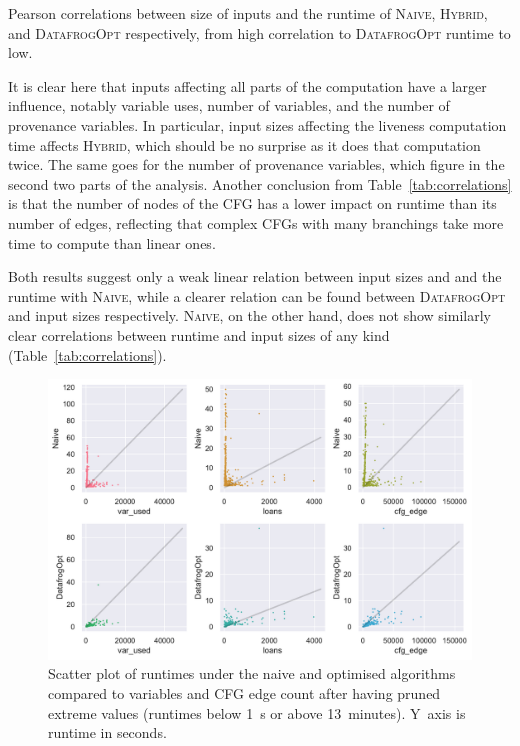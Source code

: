 \documentclass[11pt,a4paper,twoside,openany]{report}
\begin{document}
{\begin{table}[ht]
  
  \caption[Pearson Correlations Between Sizes of Inputs and Runtime]{Pearson
    correlations between size of inputs and the runtime of \textsc{Naive},
    \textsc{Hybrid}, and \textsc{DatafrogOpt} respectively, from high
    correlation to \textsc{DatafrogOpt} runtime to low.}
  \label{tab:correlations}
\end{table}%

It is clear here that inputs affecting all parts of the computation have a
larger influence, notably variable uses, number of variables, and the number of
provenance variables. In particular, input sizes affecting the liveness
computation time affects \textsc{Hybrid}, which should be no surprise as it does
that computation twice. The same goes for the number of provenance variables,
which figure in the second two parts of the analysis. Another conclusion from
Table~\ref{tab:correlations} is that the number of nodes of the CFG has a lower
impact on runtime than its number of edges, reflecting that complex CFGs with
many branchings take more time to compute than linear ones.

Both results suggest only a weak linear relation between input sizes and
and the runtime with \textsc{Naive}, while a clearer relation can be
found between \textsc{DatafrogOpt} and input sizes respectively. \textsc{Naive},
on the other hand, does not show similarly clear correlations between runtime
and input sizes of any kind (Table~\ref{tab:correlations}).

\begin{figure}
  \includegraphics[width=0.9\linewidth]{Graphs/corr_scatter.pdf}
  \caption[Scatter Plot of Runtimes On Two Polonius Variants vs. nr. of CFG
  Edges and Variables]{Scatter plot of runtimes under the naive and optimised
    algorithms compared to variables and CFG edge count after having pruned
    extreme values (runtimes below 1~s or above 13~minutes). Y~axis is runtime
    in seconds.}
  \label{fig:input-scatter}
\end{figure}

}
\end{document}
